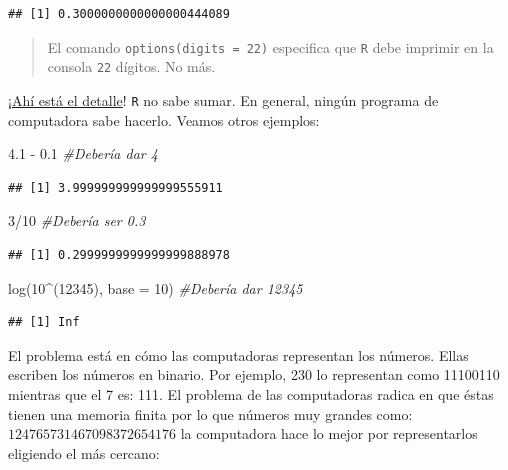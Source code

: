 \documentclass[
]{book}
\newenvironment{Shaded}{\begin{snugshade}}{\end{snugshade}}
\newcommand{\AttributeTok}[1]{\textcolor[rgb]{0.77,0.63,0.00}{#1}}
\newcommand{\CommentTok}[1]{\textcolor[rgb]{0.56,0.35,0.01}{\textit{#1}}}
\newcommand{\DecValTok}[1]{\textcolor[rgb]{0.00,0.00,0.81}{#1}}
\newcommand{\FloatTok}[1]{\textcolor[rgb]{0.00,0.00,0.81}{#1}}
\newcommand{\FunctionTok}[1]{\textcolor[rgb]{0.00,0.00,0.00}{#1}}
\newcommand{\NormalTok}[1]{#1}
\newcommand{\SpecialCharTok}[1]{\textcolor[rgb]{0.00,0.00,0.00}{#1}}
\begin{document}
\begin{verbatim}
## [1] 0.3000000000000000444089
\end{verbatim}

\begin{quote}
El comando \texttt{options(digits\ =\ 22)} especifica que \texttt{R} debe imprimir en la consola \texttt{22} dígitos. No más.
\end{quote}

¡\href{https://www.youtube.com/watch?v=1jaCpeXg-gg}{Ahí está el detalle}! \texttt{R} no sabe sumar. En general, ningún programa de computadora sabe hacerlo. Veamos otros ejemplos:

\begin{Shaded}
\begin{Highlighting}[]
\FloatTok{4.1} \SpecialCharTok{{-}} \FloatTok{0.1} \CommentTok{\#Debería dar 4}
\end{Highlighting}
\end{Shaded}

\begin{verbatim}
## [1] 3.999999999999999555911
\end{verbatim}

\begin{Shaded}
\begin{Highlighting}[]
\DecValTok{3}\SpecialCharTok{/}\DecValTok{10}      \CommentTok{\#Debería ser 0.3}
\end{Highlighting}
\end{Shaded}

\begin{verbatim}
## [1] 0.2999999999999999888978
\end{verbatim}

\begin{Shaded}
\begin{Highlighting}[]
\FunctionTok{log}\NormalTok{(}\DecValTok{10}\SpecialCharTok{\^{}}\NormalTok{(}\DecValTok{12345}\NormalTok{), }\AttributeTok{base =} \DecValTok{10}\NormalTok{) }\CommentTok{\#Debería dar 12345}
\end{Highlighting}
\end{Shaded}

\begin{verbatim}
## [1] Inf
\end{verbatim}

El problema está en cómo las computadoras representan los números. Ellas escriben los números en binario. Por ejemplo, 230 lo representan como 11100110 mientras que el 7 es: 111. El problema de las computadoras radica en que éstas tienen una memoria finita por lo que números muy grandes como: \(124765731467098372654176\) la computadora hace lo mejor por representarlos eligiendo el más cercano:
\end{document}
